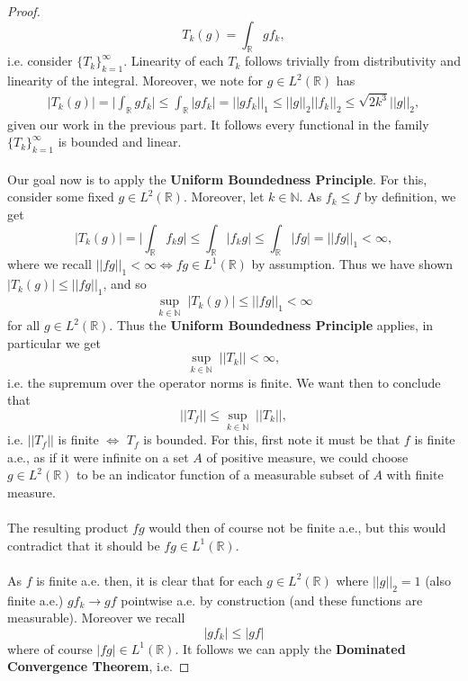 \documentclass[12pt]{article}
\newcommand{\N}{\mathbb{N}}
\newenvironment{ex}[2][Exercise]{\begin{trivlist}
\item[\hskip \labelsep {\bfseries #1}\hskip \labelsep {\bfseries #2.}]}{\end{trivlist}}
\begin{document}
\begin{ex}{17}
\begin{proof}
        $$T_k(g) = \int_\mathbb{R} gf_k,$$
        i.e. consider $\{T_k\}_{k = 1}^\infty$. Linearity of each $T_k$ follows trivially from distributivity and linearity of the integral. Moreover, we note for $g \in L^2(\mathbb{R})$ has
        \begin{align*}
            |T_k(g)| = \Big | \int_\mathbb{R} gf_k \Big | \leq \int_\mathbb{R} |gf_k| = ||gf_k||_1 \leq ||g||_2||f_k||_2 \leq \sqrt{2k^3}||g||_2,
        \end{align*}
        given our work in the previous part. It follows every functional in the family $\{T_k\}_{k = 1}^\infty$ is bounded and linear. \\ \\
        Our goal now is to apply the \textbf{Uniform Boundedness Principle}. For this, consider some fixed $g \in L^2(\mathbb{R})$. Moreover, let $k \in \N$. As $f_k \leq f$ by definition, we get 
        $$|T_k(g)| = \Big | \int_\mathbb{R} f_kg \Big | \leq \int_\mathbb{R} |f_kg| \leq \int_\mathbb{R} |fg| = ||fg||_1 < \infty,$$
        where we recall $||fg||_1 < \infty \Leftrightarrow fg \in L^1(\mathbb{R})$ by assumption. Thus we have shown $|T_k(g)| \leq ||fg||_1$, and so 
        $$\underset{k \in \N}{\sup} \; |T_k(g)| \leq ||fg||_1 < \infty$$
        for all $g \in L^2(\mathbb{R})$. Thus the \textbf{Uniform Boundedness Principle} applies, in particular we get 
        $$\underset{k \in \N}{\sup} \; ||T_k|| < \infty,$$
        i.e. the supremum over the operator norms is finite. We want then to conclude that 
        $$||T_f|| \leq \underset{k \in \N}{\sup} \; ||T_k||,$$
        i.e. $||T_f||$ is finite $\Leftrightarrow$ $T_f$ is bounded. For this, first note it must be that $f$ is finite a.e., as if it were infinite on a set $A$ of positive measure, we could choose $g \in L^2(\mathbb{R})$ to be an indicator function of a measurable subset of $A$ with finite measure. \\ \\
        The resulting product $fg$ would then of course not be finite a.e., but this would contradict that it should be $fg \in L^1(\mathbb{R})$. \\ \\ 
        As $f$ is finite a.e. then, it is clear that for each $g \in L^2(\mathbb{R})$ where $||g||_2 = 1$ (also finite a.e.) $gf_k \rightarrow gf$ pointwise a.e. by construction (and these functions are measurable). Moreover we recall 
        $$|gf_k| \leq |gf|$$
        where of course $|fg| \in L^1(\mathbb{R})$. It follows we can apply the \textbf{Dominated Convergence Theorem}, i.e. 

\end{proof}
\end{ex}
\end{document}
